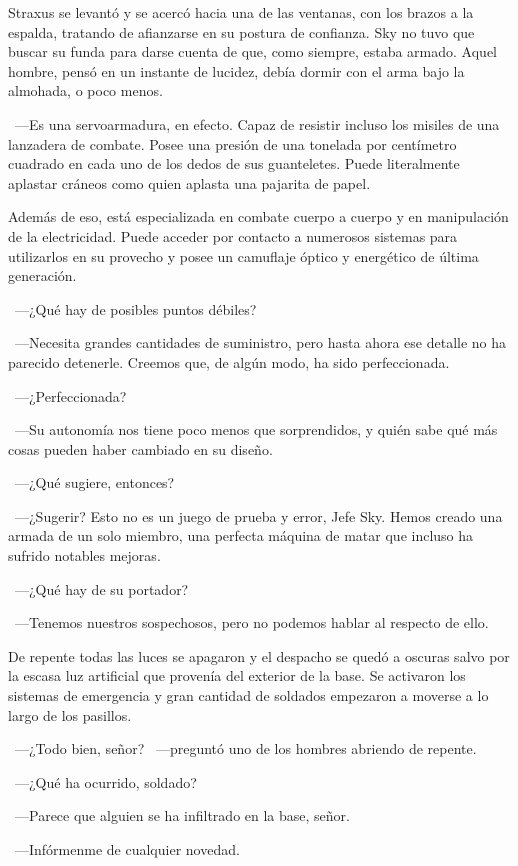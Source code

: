 Straxus se levantó y se acercó hacia una de las ventanas, con los brazos a la espalda, tratando de afianzarse en su postura de confianza. Sky no tuvo que buscar su funda para darse cuenta de que, como siempre, estaba armado. Aquel hombre, pensó en un instante de lucidez, debía dormir con el arma bajo la almohada, o poco menos.

~---Es una servoarmadura, en efecto. Capaz de resistir incluso los misiles de una lanzadera de combate. Posee una presión de una tonelada por centímetro cuadrado en cada uno de los dedos de sus guanteletes. Puede literalmente aplastar cráneos como quien aplasta una pajarita de papel.

\rquoti Además de eso, está especializada en combate cuerpo a cuerpo y en manipulación de la electricidad. Puede acceder por contacto a numerosos sistemas para utilizarlos en su provecho y posee un camuflaje óptico y energético de última generación.

~---¿Qué hay de posibles puntos débiles?

~---Necesita grandes cantidades de suministro, pero hasta ahora ese detalle no ha parecido detenerle. Creemos que, de algún modo, ha sido perfeccionada.

~---¿Perfeccionada?

~---Su autonomía nos tiene poco menos que sorprendidos, y quién sabe qué más cosas pueden haber cambiado en su diseño.

~---¿Qué sugiere, entonces?

~---¿Sugerir? Esto no es un juego de prueba y error, Jefe Sky. Hemos creado una armada de un solo miembro, una perfecta máquina de matar que incluso ha sufrido notables mejoras.

~---¿Qué hay de su portador?

~---Tenemos nuestros sospechosos, pero no podemos hablar al respecto de ello.

De repente todas las luces se apagaron y el despacho se quedó a oscuras salvo por la escasa luz artificial que provenía del exterior de la base. Se activaron los sistemas de emergencia y gran cantidad de soldados empezaron a moverse a lo largo de los pasillos.

~---¿Todo bien, señor? ~---preguntó uno de los hombres abriendo de repente.

~---¿Qué ha ocurrido, soldado?

~---Parece que alguien se ha infiltrado en la base, señor.

~---Infórmenme de cualquier novedad.

